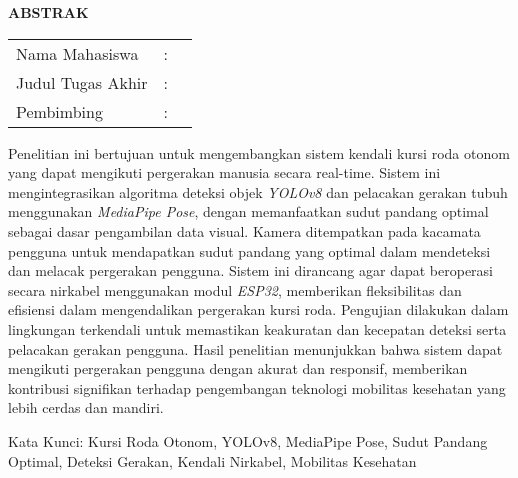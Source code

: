 \begin{center}
  \large\textbf{ABSTRAK}
\end{center}


\vspace{2ex}

\begingroup
\setlength{\tabcolsep}{0pt}

\noindent
\begin{tabularx}{\textwidth}{l >{\centering}m{2em} X}
  Nama Mahasiswa    & : & \name{}         \\

  Judul Tugas Akhir & : & \tatitle{}      \\

  Pembimbing        & : & \advisor{}   \\
\end{tabularx}
\endgroup

Penelitian ini bertujuan untuk mengembangkan sistem kendali kursi roda otonom yang dapat mengikuti pergerakan manusia secara real-time. Sistem ini mengintegrasikan algoritma deteksi objek \emph{YOLOv8} dan pelacakan gerakan tubuh menggunakan \emph{MediaPipe Pose}, dengan memanfaatkan sudut pandang optimal sebagai dasar pengambilan data visual. Kamera ditempatkan pada kacamata pengguna untuk mendapatkan sudut pandang yang optimal dalam mendeteksi dan melacak pergerakan pengguna. Sistem ini dirancang agar dapat beroperasi secara nirkabel menggunakan modul \emph{ESP32}, memberikan fleksibilitas dan efisiensi dalam mengendalikan pergerakan kursi roda. Pengujian dilakukan dalam lingkungan terkendali untuk memastikan keakuratan dan kecepatan deteksi serta pelacakan gerakan pengguna. Hasil penelitian menunjukkan bahwa sistem dapat mengikuti pergerakan pengguna dengan akurat dan responsif, memberikan kontribusi signifikan terhadap pengembangan teknologi mobilitas kesehatan yang lebih cerdas dan mandiri.

Kata Kunci: Kursi Roda Otonom, YOLOv8, MediaPipe Pose, Sudut Pandang Optimal, Deteksi Gerakan, Kendali Nirkabel, Mobilitas Kesehatan
